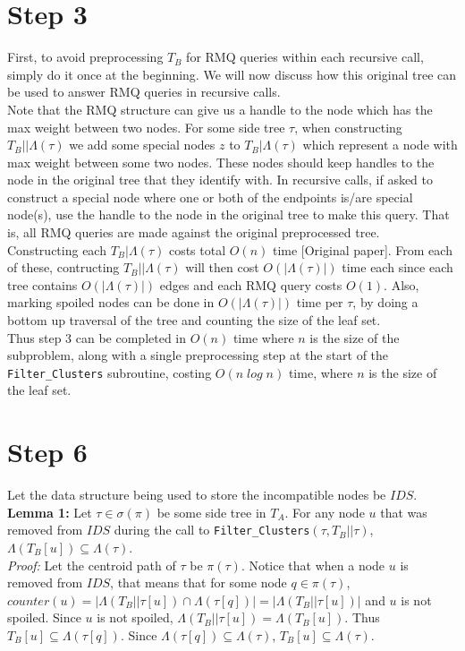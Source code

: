 \documentclass[a4paper]{article}
\begin{document}
    \section{Step 3}

    First, to avoid preprocessing $T_B$ for RMQ queries within each recursive call, simply do it once at the beginning. We will now discuss how this original tree can be used to answer RMQ queries in recursive calls.\\

    Note that the RMQ structure can give us a handle to the node which has the max weight between two nodes. For some side tree $\tau$, when constructing $T_B||\Lambda(\tau)$ we add some special nodes $z$ to $T_B|\Lambda(\tau)$ which represent a node with max weight between some two nodes. These nodes should keep handles to the node in the original tree that they identify with. In recursive calls, if asked to construct a special node where one or both of the endpoints is/are special node(s), use the handle to the node in the original tree to make this query. That is, all RMQ queries are made against the original preprocessed tree.\\

    Constructing each $T_B|\Lambda(\tau)$ costs total $O(n)$ time [Original paper]. From each of these, contructing $T_B||\Lambda(\tau)$ will then cost $O(|\Lambda(\tau)|)$ time each since each tree contains $O(|\Lambda(\tau)|)$ edges and each RMQ query costs $O(1)$. Also, marking spoiled nodes can be done in $O(|\Lambda(\tau)|)$ time per $\tau$, by doing a bottom up traversal of the tree and counting the size of the leaf set.\\

    Thus step 3 can be completed in $O(n)$ time where $n$ is the size of the subproblem, along with a single preprocessing step at the start of the \texttt{Filter\_Clusters} subroutine, costing $O(n\;log\;n)$ time, where $n$ is the size of the leaf set.

    \section{Step 6}

    Let the data structure being used to store the incompatible nodes be $IDS$.\\

    \textbf{Lemma 1:} Let $\tau \in \sigma(\pi)$ be some side tree in $T_A$. For any node $u$ that was removed from $IDS$ during the call to \texttt{Filter\_Clusters}$(\tau, T_B||\tau)$, $\Lambda(T_B[u]) \subseteq \Lambda(\tau)$.\\
    \textit{Proof:} Let the centroid path of $\tau$ be $\pi(\tau)$. Notice that when a node $u$ is removed from $IDS$, that means that for some node $q \in \pi(\tau)$, $counter(u) = |\Lambda(T_B||\tau[u]) \cap \Lambda(\tau[q])| = |\Lambda(T_B||\tau[u])|$ and $u$ is not spoiled. Since $u$ is not spoiled, $\Lambda(T_B||\tau[u]) = \Lambda(T_B[u])$. Thus $T_B[u] \subseteq \Lambda(\tau[q])$. Since $\Lambda(\tau[q]) \subseteq \Lambda(\tau)$, $T_B[u] \subseteq \Lambda(\tau)$.\\
\end{document}
